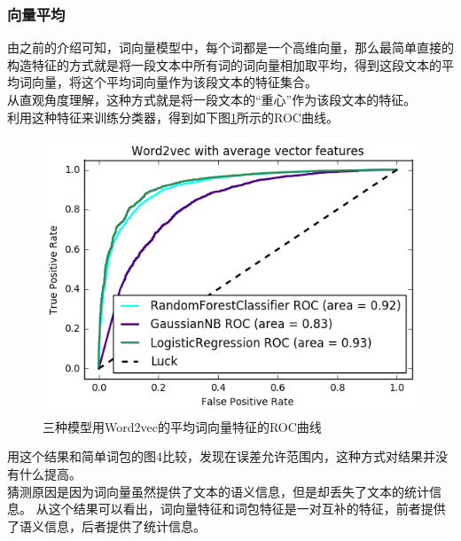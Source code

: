 \subsubsection{向量平均}
由之前的介绍可知，词向量模型中，每个词都是一个高维向量，那么最简单直接的构造特征的方式就是将一段文本中所有词的词向量相加取平均，得到这段文本的平均词向量，将这个平均词向量作为该段文本的特征集合。\\
从直观角度理解，这种方式就是将一段文本的“重心”作为该段文本的特征。\\
利用这种特征来训练分类器，得到如下图\ref{fig:3cword2vecaverage}所示的ROC曲线。
\begin{figure}[h]
\centering
\includegraphics[width=0.9\linewidth]{3c_word2vec_average}
\caption[word2vec_average]{三种模型用Word2vec的平均词向量特征的ROC曲线}
\label{fig:3cword2vecaverage}
\end{figure}
用这个结果和简单词包的图4比较，发现在误差允许范围内，这种方式对结果并没有什么提高。\\
猜测原因是因为词向量虽然提供了文本的语义信息，但是却丢失了文本的统计信息。
从这个结果可以看出，词向量特征和词包特征是一对互补的特征，前者提供了语义信息，后者提供了统计信息。\\